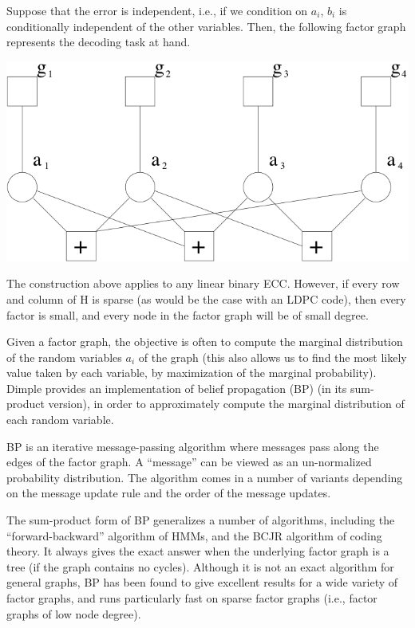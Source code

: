 Suppose that the error is independent, i.e., if we condition on $a_i$, $b_i$ is conditionally independent of the other variables.   Then, the following factor graph represents the decoding task at hand.

\includegraphics{images/DecoderExample.png}




The construction above applies to any linear binary ECC.  However, if every row and column of H is sparse (as would be the case with an LDPC code), then every factor is small, and every node in the factor graph will be of small degree.

Given a factor graph, the objective is often to compute the marginal distribution of the random variables $a_i$ of the graph (this also allows us to find the most likely value taken by each variable, by maximization of the marginal probability). Dimple provides an implementation of belief propagation (BP) (in its sum-product version), in order to approximately compute the marginal distribution of each random variable. 

BP is an iterative message-passing algorithm where messages pass along the edges of the factor graph.  A ``message'' can be viewed as an un-normalized probability distribution.  The algorithm comes in a number of variants depending on the message update rule and the order of the message updates.  

The sum-product form of BP generalizes a number of algorithms, including the ``forward-backward'' algorithm of HMMs, and the BCJR algorithm of coding theory. It always gives the exact answer when the underlying factor graph is a tree (if the graph contains no cycles). Although it is not an exact algorithm for general graphs, BP has been found to give excellent results for a wide variety of factor graphs, and runs particularly fast on sparse factor graphs (i.e., factor graphs of low node degree).

